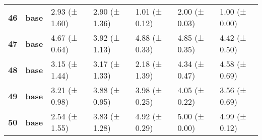 \begin{longtable}{lllllll}
\cline{1-7}
\textbf{46} & \textbf{base} & 2.93 (± 1.60) & 2.90 (± 1.36) & 1.01 (± 0.12) & 2.00 (± 0.03) & 1.00 (± 0.00) \\
\cline{1-7}
\textbf{47} & \textbf{base} & 4.67 (± 0.64) & 3.92 (± 1.13) & 4.88 (± 0.33) & 4.85 (± 0.35) & 4.42 (± 0.50) \\
\cline{1-7}
\textbf{48} & \textbf{base} & 3.15 (± 1.44) & 3.17 (± 1.33) & 2.18 (± 1.39) & 4.34 (± 0.47) & 4.58 (± 0.69) \\
\cline{1-7}
\textbf{49} & \textbf{base} & 3.21 (± 0.98) & 3.88 (± 0.95) & 3.98 (± 0.25) & 4.05 (± 0.22) & 3.56 (± 0.69) \\
\cline{1-7}
\textbf{50} & \textbf{base} & 2.54 (± 1.55) & 3.83 (± 1.28) & 4.92 (± 0.29) & 5.00 (± 0.00) & 4.99 (± 0.12) \\
\cline{1-7}
\end{longtable}
